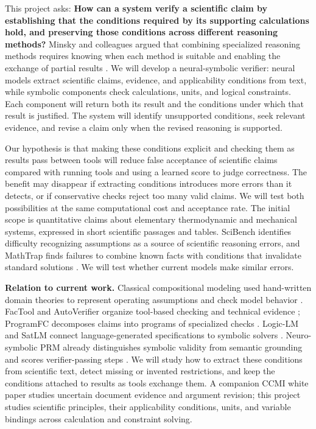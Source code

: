 \documentclass[12pt]{article}
\begin{document}
This project asks: \textbf{How can a system verify a scientific claim by establishing that the conditions required by its supporting calculations hold, and preserving those conditions across different reasoning methods?} Minsky and colleagues argued that combining specialized reasoning methods requires knowing when each method is suitable and enabling the exchange of partial results \citep{mccarthy2002diversity}. We will develop a neural-symbolic verifier: neural models extract scientific claims, evidence, and applicability conditions from text, while symbolic components check calculations, units, and logical constraints. Each component will return both its result and the conditions under which that result is justified. The system will identify unsupported conditions, seek relevant evidence, and revise a claim only when the revised reasoning is supported.

Our hypothesis is that making these conditions explicit and checking them as results pass between tools will reduce false acceptance of scientific claims compared with running tools and using a learned score to judge correctness. The benefit may disappear if extracting conditions introduces more errors than it detects, or if conservative checks reject too many valid claims. We will test both possibilities at the same computational cost and acceptance rate. The initial scope is quantitative claims about elementary thermodynamic and mechanical systems, expressed in short scientific passages and tables. SciBench identifies difficulty recognizing assumptions as a source of scientific reasoning errors, and MathTrap finds failures to combine known facts with conditions that invalidate standard solutions \citep{wang2024scibench,zhao2024trap}. We will test whether current models make similar errors.

\textbf{Relation to current work.} Classical compositional modeling used hand-written domain theories to represent operating assumptions and check model behavior \citep{falkenhainer1991compositional}. FacTool and AutoVerifier organize tool-based checking and technical evidence \citep{chern2023factool,du2026autoverifier}; ProgramFC decomposes claims into programs of specialized checks \citep{pan2023programfc}. Logic-LM and SatLM connect language-generated specifications to symbolic solvers \citep{pan2023logiclm,ye2023satlm}. Neuro-symbolic PRM already distinguishes symbolic validity from semantic grounding and scores verifier-passing steps \citep{zi2026nsprm}. We will study how to extract these conditions from scientific text, detect missing or invented restrictions, and keep the conditions attached to results as tools exchange them. A companion CCMI white paper studies uncertain document evidence and argument revision; this project studies scientific principles, their applicability conditions, units, and variable bindings across calculation and constraint solving.
\end{document}
